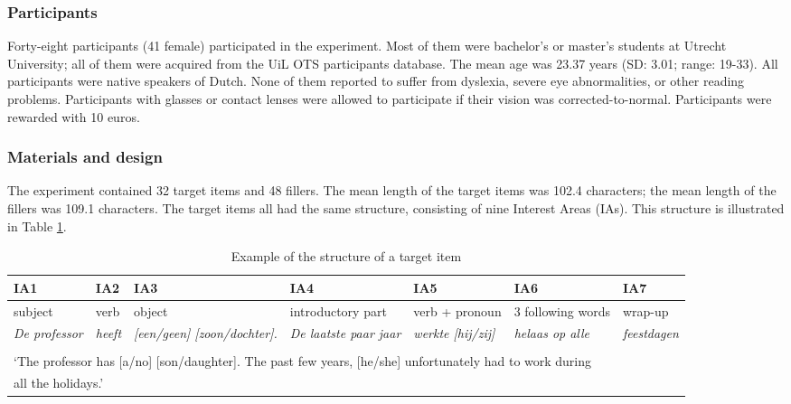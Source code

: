 \documentclass[11pt]{article} %
\begin{document}
\subsubsection{Participants}
Forty-eight participants (41 female) participated in the experiment. Most of them were bachelor's or master's students at Utrecht University; all of them were acquired from the UiL OTS participants database. The mean age was 23.37 years (SD: 3.01; range: 19-33). All participants were native speakers of Dutch. None of them reported to suffer from dyslexia, severe eye abnormalities, or other reading problems. Participants with glasses or contact lenses were allowed to participate if their vision was corrected-to-normal. Participants were rewarded with 10 euros. 



\subsubsection{Materials and design}
The experiment contained 32 target items and 48 fillers. The mean length of the target items was 102.4 characters; the mean length of the fillers was 109.1 characters. The target items all had the same structure, consisting of nine Interest Areas (IAs). This structure is illustrated in Table \ref{tab:targetitem}. 


\begin{table}[ht]\small
\center

\caption{\label{tab:targetitem}\footnotesize{Example of the structure of a target item}}\vspace{-3mm}
\hspace*{-1cm}\begin{tabular}[width=0.5\textwidth]{llp{2.1cm}p{3cm}p{3cm}p{1.5cm}l}
\hline
IA1 & IA2 & IA3 & IA4 & IA5 & IA6 & IA7 \\
\hline
subject & verb & object & introductory part & verb + pronoun & 3 following words & wrap-up\vspace{4mm}\\
\textit{De professor} & \textit{heeft} & \textit{[een/geen] [zoon/dochter].} & \textit{De laatste paar jaar} & \textit{werkte [hij/zij]} & \textit{helaas op alle} & \textit{feestdagen}\\\\
\multicolumn{7}{l}{‘The professor has [a/no] [son/daughter]. The past few years, [he/she] unfortunately had to work during}\\
\multicolumn{7}{l}{all the holidays.’}\\
\hline
\end{tabular}\hspace*{-1cm}
\end{table}
\end{document}
